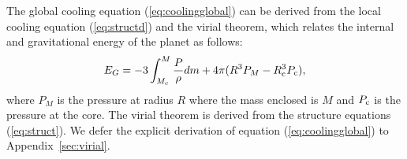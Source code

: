\documentclass[apj]{emulateapj}
\newcommand{\App}[1]{Appendix~\ref{#1}}
\newcommand{\co}{_{\rm c}}
\begin{document}


The global cooling equation (\ref{eq:coolingglobal}) can be derived from the local cooling equation (\ref{eq:structd}) and the virial theorem, which relates the internal and gravitational energy of the planet as follows:
\begin{equation}
\label{eq:virial}
E_G=-3 \int_{M_c}^M \frac{P}{\rho} dm + 4 \pi (R^3 P_M-R\co^3 P\co),
\end{equation}
where $P_M$ is the pressure at radius $R$ where the mass enclosed is $M$ and $P\co$ is the pressure at the core. The virial theorem is derived from the structure equations (\ref{eq:struct}). We defer the explicit derivation of equation (\ref{eq:coolingglobal}) to \App{sec:virial}.





%
%
%
\end{document}

